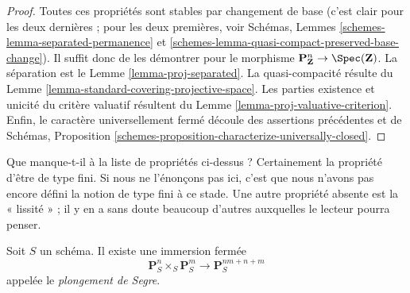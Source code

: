 \begin{proof}
Toutes ces propriétés sont stables par changement de base (c'est clair pour
les deux dernières ; pour les deux premières, voir Schémas, Lemmes
\ref{schemes-lemma-separated-permanence} et
\ref{schemes-lemma-quasi-compact-preserved-base-change}). Il suffit donc de les
démontrer pour le morphisme
$\mathbf{P}^n_{\mathbf{Z}} \to \Spec(\mathbf{Z})$.
La séparation est le Lemme \ref{lemma-proj-separated}. La quasi-compacité
résulte du Lemme \ref{lemma-standard-covering-projective-space}.
Les parties existence et unicité du critère valuatif résultent du
Lemme \ref{lemma-proj-valuative-criterion}. Enfin, le caractère universellement
fermé découle des assertions précédentes et de Schémas,
Proposition \ref{schemes-proposition-characterize-universally-closed}.
\end{proof}

\begin{remark}
\label{remark-missing-finite-type}
Que manque-t-il à la liste de propriétés ci-dessus ? Certainement la propriété
d'être de type fini. Si nous ne l'énonçons pas ici, c'est que nous n'avons pas
encore défini la notion de type fini à ce stade. Une autre propriété absente
est la « lissité » ; il y en a sans doute beaucoup d'autres auxquelles le
lecteur pourra penser.
\end{remark}

\begin{lemma}
\label{lemma-segre-embedding}
Soit $S$ un schéma. Il existe une immersion fermée
$$
\mathbf{P}^n_S \times_S \mathbf{P}^m_S
\longrightarrow
\mathbf{P}^{nm + n + m}_S
$$
appelée le {\it plongement de Segre}.
\end{lemma}

